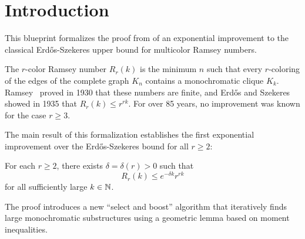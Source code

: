 
\section{Introduction}

This blueprint formalizes the proof from \cite{CGMS} of an exponential improvement to the classical Erdős-Szekeres upper bound for multicolor Ramsey numbers.

The \(r\)-color Ramsey number \(R_r(k)\) is the minimum \(n\) such that every \(r\)-coloring of the edges of the complete graph \(K_n\) contains a monochromatic clique \(K_k\).
Ramsey~\cite{Ramsey30} proved in 1930 that these numbers are finite, and Erdős and Szekeres~\cite{ESz35} showed in 1935 that \(R_r(k) \le r^{rk}\).
For over 85 years, no improvement was known for the case \(r \ge 3\).

The main result of this formalization establishes the first exponential improvement over the Erdős-Szekeres bound for all \(r \ge 2\):


\begin{theorem}
    \label{thm:Ramsey:multicolour}
    For each \(r \ge 2\), there exists \(\delta = \delta(r) > 0\) such that
    \begin{equation*}
        R_r(k) \le e^{-\delta k} r^{rk}
    \end{equation*}
    for all sufficiently large \(k \in \mathbb{N}\).
\end{theorem}

The proof introduces a new ``select and boost'' algorithm that iteratively finds large monochromatic substructures using a geometric lemma based on moment inequalities.

